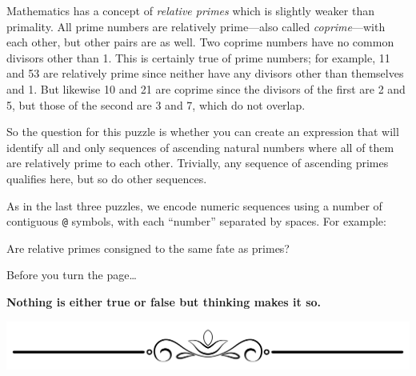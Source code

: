 Mathematics has a concept of \emph{relative primes} which is slightly
weaker than primality. All prime numbers are relatively prime---also
called \emph{coprime}---with each other, but other pairs are as well.
Two coprime numbers have no common divisors other than 1. This is
certainly true of prime numbers; for example, 11 and 53 are relatively
prime since neither have any divisors other than themselves and 1. But
likewise 10 and 21 are coprime since the divisors of the first are 2 and
5, but those of the second are 3 and 7, which do not overlap.

So the question for this puzzle is whether you can create an expression
that will identify all and only sequences of ascending natural numbers
where all of them are relatively prime to each other. Trivially, any
sequence of ascending primes qualifies here, but so do other sequences.

As in the last three puzzles, we encode numeric sequences using a number
of contiguous \texttt{@} symbols, with each ``number'' separated by
spaces. For example:

\newpage

\begin{Shaded}
\begin{Highlighting}[]
\OperatorTok{=} 
\OperatorTok{=} 
\OperatorTok{=} 
\OperatorTok{=} 
\OperatorTok{=} 
\OperatorTok{=} 
\end{Highlighting}
\end{Shaded}

Are relative primes consigned to the same fate as primes?

Before you turn the page\ldots{}

\textbf{Nothing is either true or false but thinking makes it so.}

\includegraphics{images/Elegant-Flourish-Frame-Extrapolated-19.svg}

